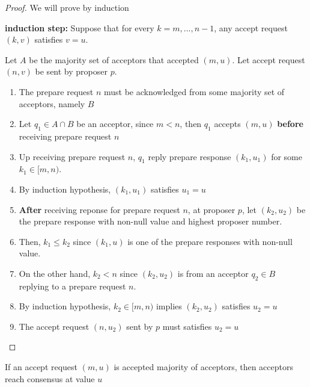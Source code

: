 \documentclass{article}
\begin{document}
\begin{proof}
	We will prove by induction
	
	\textbf{induction step:} Suppose that for every $k = m, ..., n-1$, any accept request $(k, v)$ satisfies $v = u$.
	
	Let $A$ be the majority set of acceptors that accepted $(m, u)$. Let accept request $(n, v)$ be sent by proposer $p$.
	
	\begin{enumerate}
		\item The prepare request $n$ must be acknowledged from some majority set of acceptors, namely $B$
		
		\item Let $q_1 \in A \cap B$ be an acceptor, since $m < n$, then $q_1$ accepts $(m, u)$ \textbf{before} receiving prepare request $n$
		
		\item Up receiving prepare request $n$, $q_1$ reply prepare response $(k_1, u_1)$ for some $k_1 \in [m, n)$.
		
		\item By induction hypothesis, $(k_1, u_1)$ satisfies $u_1 = u$
		
		\item \textbf{After} receiving reponse for prepare request $n$, at proposer $p$, let $(k_2, u_2)$ be the prepare response with non-null value and highest proposer number.
		
		\item Then, $k_1 \leq k_2$ since $(k_1, u)$ is one of the prepare responses with non-null value.
		
		\item On the other hand, $k_2 < n$ since $(k_2, u_2)$ is from an acceptor $q_2 \in B$ replying to a prepare request $n$. 
		
		\item By induction hypothesis, $k_2 \in [m, n)$ implies $(k_2, u_2)$ satisfies $u_2 = u$
		
		\item The accept request $(n, u_2)$ sent by $p$ must satisfies $u_2 = u$
	\end{enumerate}
\end{proof}

\begin{corollary}
	If an accept request $(m, u)$ is accepted majority of acceptors, then acceptors reach consensus at value $u$
\end{corollary}
\end{document}
